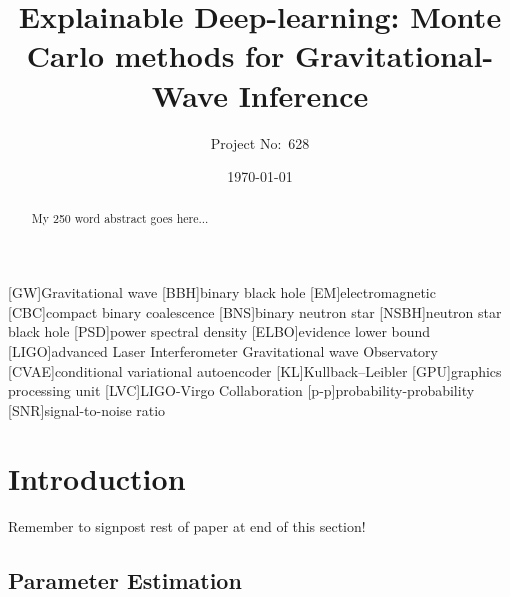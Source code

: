 \documentclass[aps,superscriptaddress,twocolumn,nopreprintnumbers,floatfix,groupedaddress]{revtex4-1}
\begin{document}
\title{Explainable Deep-learning: Monte Carlo methods for Gravitational-Wave Inference}

\author{Project No:~628}
%

\date{\today}

\begin{abstract}
My 250 word abstract goes here...
\end{abstract}

\maketitle

[GW]{Gravitational wave}
[BBH]{binary black hole}
[EM]{electromagnetic}
[CBC]{compact binary coalescence}
[BNS]{binary neutron star}
[NSBH]{neutron star black hole}
[PSD]{power spectral density}
[ELBO]{evidence lower bound}
[LIGO]{advanced Laser Interferometer Gravitational wave Observatory}
[CVAE]{conditional variational autoencoder}
[KL]{Kullback--Leibler}
[GPU]{graphics processing unit}
[LVC]{LIGO-Virgo Collaboration}
[p-p]{probability-probability}
[SNR]{signal-to-noise ratio}

\section{Introduction}\label{intro}

Remember to signpost rest of paper at end of this section!

\subsection{Parameter Estimation}
\end{document}

